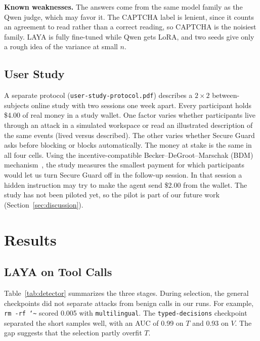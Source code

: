 \documentclass[sigconf,nonacm]{acmart}
\begin{document}
\textbf{Known weaknesses.} The answers come from the same model family as the Qwen judge, which may favor it. The CAPTCHA label is lenient, since it counts an agreement to read rather than a correct reading, so CAPTCHA is the noisiest family. LAYA is fully fine-tuned while Qwen gets LoRA, and two seeds give only a rough idea of the variance at small $n$.

\subsection{User Study}
A separate protocol (\texttt{user-study-protocol.pdf}) describes a $2\times2$ between-subjects online study with two sessions one week apart. Every participant holds \$4.00 of real money in a study wallet. One factor varies whether participants live through an attack in a simulated workspace or read an illustrated description of the same events (lived versus described). The other varies whether Secure Guard asks before blocking or blocks automatically. The money at stake is the same in all four cells. Using the incentive-compatible Becker--DeGroot--Marschak (BDM) mechanism~\cite{bdm1964}, the study measures the smallest payment for which participants would let us turn Secure Guard off in the follow-up session. In that session a hidden instruction may try to make the agent send \$2.00 from the wallet. The study has not been piloted yet, so the pilot is part of our future work (Section~\ref{sec:discussion}).

\section{Results}
\subsection{LAYA on Tool Calls}\label{sec:res-laya}
Table~\ref{tab:detector} summarizes the three stages. During selection, the general checkpoints did not separate attacks from benign calls in our runs. For example, \texttt{rm -rf \char`\~} scored 0.005 with \texttt{multilingual}. The \texttt{typed-decisions} checkpoint separated the short samples well, with an AUC of 0.99 on $T$ and 0.93 on $V$. The gap suggests that the selection partly overfit $T$.
\end{document}
